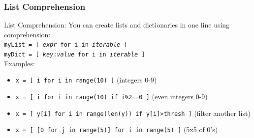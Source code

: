 \documentclass{beamer}
\newcommand{\code}[1]{\texttt{#1}}
\begin{document}
\begin{frame}	
	\frametitle{List Comprehension}
	
	\begin{block}{List Comprehension:}	
		You can create lists and dictionaries in one line using comprehension: \\[2pt]
		\code{myList = [ \emph{expr} for i in \emph{iterable} ]} \\[2pt]
		\code{myDict = [ \emph{key}:\emph{value} for i in \emph{iterable} ]} \\[2pt]
		
		\vspace{10pt}
		Examples:
		\begin{footnotesize}
		\begin{itemize}
			\item \code{x = [ i for i in range(10) ]} (integers 0-9)
			\item \code{x = [ i for i in range(10) if i\%2==0 ]} (even integers 0-9)
			\item \code{x = [ y[i] for i in range(len(y)) if y[i]>thresh ]} (filter another list)
			\item \code{x = [ [0 for j in range(5)] for i in range(5) ]} (5x5 of 0's)
		\end{itemize}
		\end{footnotesize}
	\end{block}
	
\end{frame}
\end{document}

